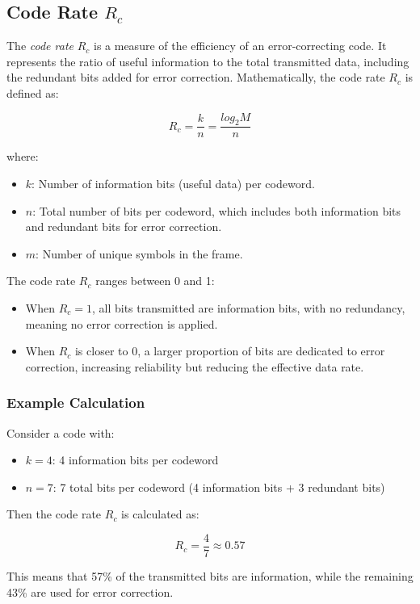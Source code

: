 \documentclass[10pt]{article}
\begin{document}
\subsection{Code Rate \( R_c \)}

The \textit{code rate} \( R_c \) is a measure of the efficiency of an error-correcting code. It represents the ratio of useful information to the total transmitted data, including the redundant bits added for error correction. Mathematically, the code rate \( R_c \) is defined as:

\[
    R_c = \frac{k}{n} = \frac{log_2{M}}{n}
\]

where:
\begin{itemize}
    \item \( k \): Number of information bits (useful data) per codeword.
    \item \( n \): Total number of bits per codeword, which includes both information bits and redundant bits for error correction.
    \item $m$: Number of unique symbols in the frame.
\end{itemize}

\noindent The code rate \( R_c \) ranges between 0 and 1:
\begin{itemize}
    \item When \( R_c = 1 \), all bits transmitted are information bits, with no redundancy, meaning no error correction is applied.
    \item When \( R_c \) is closer to 0, a larger proportion of bits are dedicated to error correction, increasing reliability but reducing the effective data rate.
\end{itemize}

\subsubsection{Example Calculation}

Consider a code with:
\begin{itemize}
    \item \( k = 4 \): 4 information bits per codeword
    \item \( n = 7 \): 7 total bits per codeword (4 information bits + 3 redundant bits)
\end{itemize}

Then the code rate \( R_c \) is calculated as:

\[
R_c = \frac{4}{7} \approx 0.57
\]

This means that 57\% of the transmitted bits are information, while the remaining 43\% are used for error correction.
\end{document}
